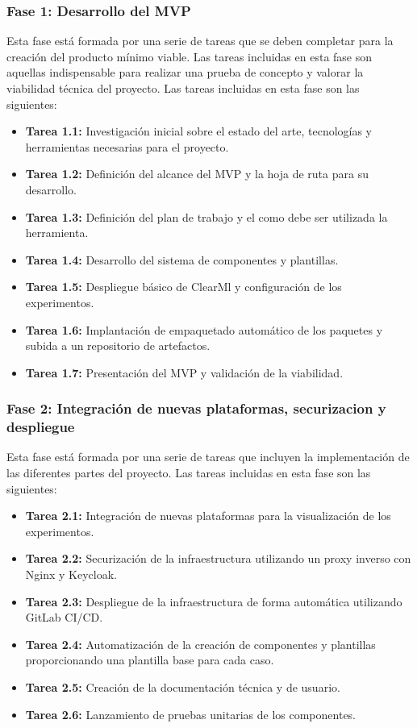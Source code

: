 \subsubsection{Fase 1: Desarrollo del MVP}
Esta fase está formada por una serie de tareas que se deben completar para
la creación del producto mínimo viable. Las tareas incluidas en esta fase son
aquellas indispensable para realizar una prueba de concepto y valorar la viabilidad
técnica del proyecto. Las tareas incluidas en esta fase son las siguientes:

\begin{itemize}
    \item \textbf{Tarea 1.1:} Investigación inicial sobre el estado del arte,
    tecnologías y herramientas necesarias para el proyecto.
    \item \textbf{Tarea 1.2:} Definición del alcance del MVP y la hoja de ruta
    para su desarrollo.
    \item \textbf{Tarea 1.3:} Definición del plan de trabajo y el como debe
    ser utilizada la herramienta.
    \item \textbf{Tarea 1.4:} Desarrollo del sistema de componentes y plantillas.
    \item \textbf{Tarea 1.5:} Despliegue básico de ClearMl y configuración de los experimentos.
    \item \textbf{Tarea 1.6:} Implantación de empaquetado automático de los
    paquetes y subida a un repositorio de artefactos.
    
    \item \textbf{Tarea 1.7:} Presentación del MVP y validación de la viabilidad.
\end{itemize}

\subsubsection{Fase 2: Integración de nuevas plataformas, securizacion y despliegue}
Esta fase está formada por una serie de tareas que incluyen la implementación
de las diferentes partes del proyecto. Las tareas incluidas en esta fase son
las siguientes:

\begin{itemize}
    \item \textbf{Tarea 2.1:} Integración de nuevas plataformas para la
    visualización de los experimentos.
    \item \textbf{Tarea 2.2:} Securización de la infraestructura utilizando
    un proxy inverso con Nginx y Keycloak.
    \item \textbf{Tarea 2.3:} Despliegue de la infraestructura de forma automática
    utilizando GitLab CI/CD.
    \item \textbf{Tarea 2.4:} Automatización de la creación de componentes y
    plantillas proporcionando una plantilla base para cada caso.
    \item \textbf{Tarea 2.5:} Creación de la documentación técnica y de usuario.
    \item \textbf{Tarea 2.6:} Lanzamiento de pruebas unitarias de los componentes.
\end{itemize}

